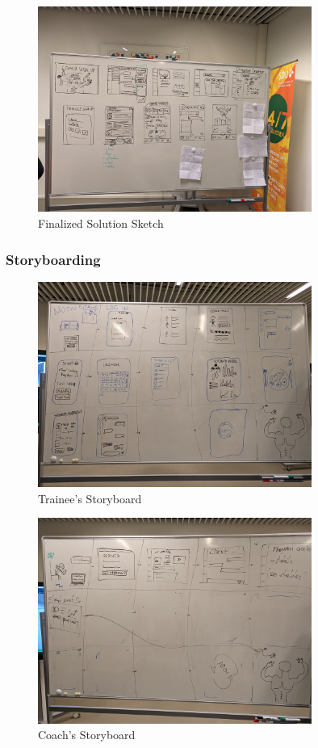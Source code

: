 \begin{figure}[H]
  \centering
  \includegraphics[width=0.8\textwidth]{images/solution_sketch.jpg}
  \caption{Finalized Solution Sketch}
  \label{fig:solutionSketch}
\end{figure}

\subsubsection{Storyboarding}

\begin{figure}[H]
  \centering
  \includegraphics[width=0.8\textwidth]{images/storyboard1.jpg}
  \caption{Trainee's Storyboard}
  \label{fig:storyboardTrainee}
\end{figure}

\begin{figure}[H]
  \centering
  \includegraphics[width=0.8\textwidth]{images/storyboard2.jpg}
  \caption{Coach's Storyboard}
  \label{fig:storyboarCoach}
\end{figure}

